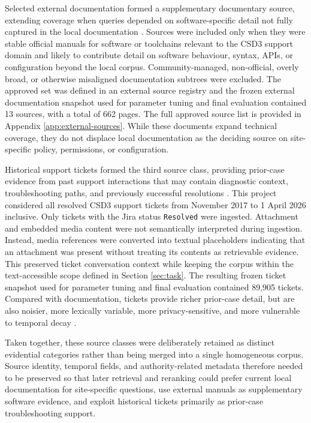 Selected external documentation formed a supplementary documentary source, extending coverage when queries depended on software-specific detail not fully captured in the local documentation \citep{AskHPC}. Sources were included only when they were stable official manuals for software or toolchains relevant to the \ac{CSD3} support domain and likely to contribute detail on software behaviour, syntax, APIs, or configuration beyond the local corpus. Community-managed, non-official, overly broad, or otherwise misaligned documentation subtrees were excluded. The approved set was defined in an external source registry and the frozen external documentation snapshot used for parameter tuning and final evaluation contained 13 sources, with a total of 662 pages. The full approved source list is provided in Appendix \ref{app:external-sources}. While these documents expand technical coverage, they do not displace local documentation as the deciding source on site-specific policy, permissions, or configuration. 

Historical support tickets formed the third source class, providing prior-case evidence from past support interactions that may contain diagnostic context, troubleshooting paths, and previously successful resolutions \citep{rodenbeckTicketHubEnablingActionable2023,joslinGeneratingFrequentlyAsked2025}. This project considered all resolved \ac{CSD3} support tickets from November 2017 to 1 April 2026 inclusive. Only tickets with the Jira status \texttt{Resolved} were ingested. Attachment and embedded media content were not semantically interpreted during ingestion. Instead, media references were converted into textual placeholders indicating that an attachment was present without treating its contents as retrievable evidence. This preserved ticket conversation context while keeping the corpus within the text-accessible scope defined in Section \ref{sec:task}. The resulting frozen ticket snapshot used for parameter tuning and final evaluation contained 89,905 tickets. Compared with documentation, tickets provide richer prior-case detail, but are also noisier, more lexically variable, more privacy-sensitive, and more vulnerable to temporal decay \citep{rodenbeckTicketHubEnablingActionable2023,joslinGeneratingFrequentlyAsked2025}. 

Taken together, these source classes were deliberately retained as distinct evidential categories rather than being merged into a single homogeneous corpus. Source identity, temporal fields, and authority-related metadata therefore needed to be preserved so that later retrieval and reranking could prefer current local documentation for site-specific questions, use external manuals as supplementary software evidence, and exploit historical tickets primarily as prior-case troubleshooting support.

